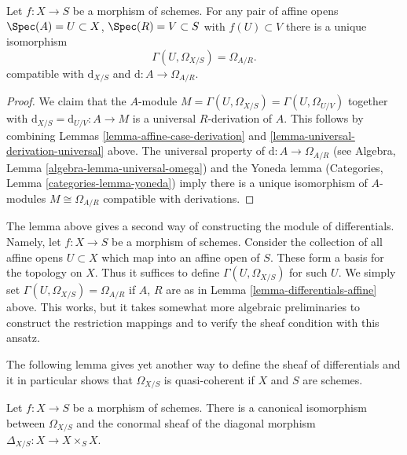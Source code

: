 \begin{lemma}
\label{lemma-differentials-affine}
Let $f : X \to S$ be a morphism of schemes. For any pair of affine opens
$\Spec(A) = U \subset X$, $\Spec(R) = V \subset S$ with $f(U) \subset V$
there is a unique isomorphism
$$
\Gamma(U, \Omega_{X/S}) = \Omega_{A/R}.
$$
compatible with $\text{d}_{X/S}$ and $\text{d} : A \to \Omega_{A/R}$.
\end{lemma}

\begin{proof}
We claim that the $A$-module $M = \Gamma(U, \Omega_{X/S}) =
\Gamma(U, \Omega_{U/V})$ together with
$\text{d}_{X/S} = \text{d}_{U/V} : A \to M$
is a universal $R$-derivation of $A$. This follows by combining
Lemmas \ref{lemma-affine-case-derivation}
and \ref{lemma-universal-derivation-universal} above.
The universal property of
$\text{d} : A \to \Omega_{A/R}$
(see Algebra, Lemma \ref{algebra-lemma-universal-omega})
and the Yoneda lemma
(Categories, Lemma \ref{categories-lemma-yoneda})
imply there is a unique isomorphism of $A$-modules
$M \cong \Omega_{A/R}$ compatible with derivations.
\end{proof}

\begin{remark}
\label{remark-differentials-glue}
The lemma above gives a second way of constructing the module of
differentials. Namely, let $f : X \to S$ be a morphism of schemes.
Consider the collection of all affine opens $U \subset X$ which
map into an affine open of $S$. These form a basis for the topology
on $X$. Thus it suffices to define $\Gamma(U, \Omega_{X/S})$
for such $U$. We simply set $\Gamma(U, \Omega_{X/S}) = \Omega_{A/R}$ if
$A$, $R$ are as in Lemma \ref{lemma-differentials-affine} above.
This works, but it takes somewhat more algebraic preliminaries
to construct the restriction mappings and to verify the sheaf
condition with this ansatz.
\end{remark}

\noindent
The following lemma gives yet another way to define the sheaf of
differentials and it in particular shows that $\Omega_{X/S}$
is quasi-coherent if $X$ and $S$ are schemes.

\begin{lemma}
\label{lemma-differentials-diagonal}
Let $f : X \to S$ be a morphism of schemes. There is a canonical
isomorphism between $\Omega_{X/S}$ and the conormal sheaf of
the diagonal morphism $\Delta_{X/S} : X \longrightarrow X \times_S X$.
\end{lemma}

